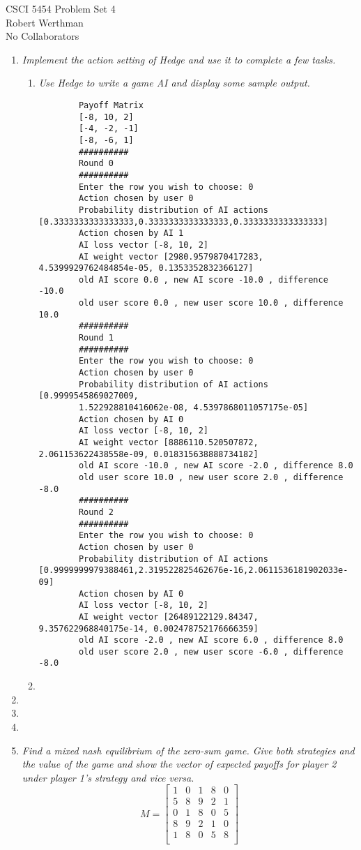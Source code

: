 \documentclass[12pt]{article}
\begin{document}
CSCI 5454 \hfill Problem Set 4\\
Robert Werthman\\
No Collaborators

\hrulefill

\begin{enumerate}
  \item \textit{Implement the action setting of Hedge and use it to complete a
  few tasks.}
  	\begin{enumerate}
  	  \item \textit{Use Hedge to write a game AI and display some sample output.}
  	    \scriptsize
  	  	\begin{verbatim}
	 	Payoff Matrix
		[-8, 10, 2]
		[-4, -2, -1]
		[-8, -6, 1]
		##########
		Round 0
		##########
		Enter the row you wish to choose: 0
		Action chosen by user 0
		Probability distribution of AI actions [0.3333333333333333,0.3333333333333333,0.3333333333333333]
		Action chosen by AI 1
		AI loss vector [-8, 10, 2]
		AI weight vector [2980.9579870417283, 4.5399929762484854e-05, 0.1353352832366127]
		old AI score 0.0 , new AI score -10.0 , difference -10.0
		old user score 0.0 , new user score 10.0 , difference 10.0
		##########
		Round 1
		##########
		Enter the row you wish to choose: 0
		Action chosen by user 0
		Probability distribution of AI actions [0.9999545869027009, 
		1.522928810416062e-08, 4.5397868011057175e-05]
		Action chosen by AI 0
		AI loss vector [-8, 10, 2]
		AI weight vector [8886110.520507872, 2.061153622438558e-09, 0.018315638888734182]
		old AI score -10.0 , new AI score -2.0 , difference 8.0
		old user score 10.0 , new user score 2.0 , difference -8.0
		##########
		Round 2
		##########
		Enter the row you wish to choose: 0
		Action chosen by user 0
		Probability distribution of AI actions [0.9999999979388461,2.319522825462676e-16,2.0611536181902033e-09]
		Action chosen by AI 0
		AI loss vector [-8, 10, 2]
		AI weight vector [26489122129.84347, 9.357622968840175e-14, 0.002478752176666359]
		old AI score -2.0 , new AI score 6.0 , difference 8.0
		old user score 2.0 , new user score -6.0 , difference -8.0
  		\end{verbatim}
  	  	\normalsize
  	  \item
  	\end{enumerate}
  \item
  \item
  \item
  \item \textit{Find a mixed nash equilibrium of the zero-sum game.  Give both
  strategies and the value of the game and show the vector of expected payoffs
  for player 2 under player 1's strategy and vice versa.}
    $$
    M = \begin{bmatrix}
        1 & 0 & 1 & 8 & 0\\
        5 & 8 & 9 & 2 & 1\\
        0 & 1 & 8 & 0 & 5\\
        8 & 9 & 2 & 1 & 0\\
        1 & 8 & 0 & 5 & 8\\
        \end{bmatrix}
    $$
    
\end{enumerate}
\end{document}
